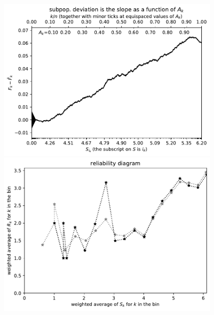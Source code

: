 \documentclass{article}
\begin{document}
\begin{figure}
\begin{centering}

\parbox{\imsize}{\includegraphics[width=\imsize]
{./codes/weighted/County_of_Los_Angeles-NP/cumulative}}
\quad\quad
\parbox{\imsize}{\includegraphics[width=\imsize]
{./codes/weighted/County_of_Los_Angeles-NP/equiscores20}}

\vspace{\vertsep}


\end{centering}
\end{figure}
\end{document}
